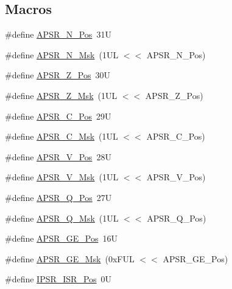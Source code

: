 \subsection*{Macros}
\begin{DoxyCompactItemize}
\item 
\#define \mbox{\hyperlink{group__CMSIS__CORE_gac469528d210043c7bd3f12f0e6824766}{A\+P\+S\+R\+\_\+\+N\+\_\+\+Pos}}~31U
\item 
\#define \mbox{\hyperlink{group__CMSIS__CORE_gadbc2cf55a026f661b53fadfcf822cef1}{A\+P\+S\+R\+\_\+\+N\+\_\+\+Msk}}~(1\+U\+L $<$$<$ A\+P\+S\+R\+\_\+\+N\+\_\+\+Pos)
\item 
\#define \mbox{\hyperlink{group__CMSIS__CORE_ga3661286d108b1aca308d7445685eae3a}{A\+P\+S\+R\+\_\+\+Z\+\_\+\+Pos}}~30U
\item 
\#define \mbox{\hyperlink{group__CMSIS__CORE_ga1deb4d1aa72bb83d1f79329406f15711}{A\+P\+S\+R\+\_\+\+Z\+\_\+\+Msk}}~(1\+U\+L $<$$<$ A\+P\+S\+R\+\_\+\+Z\+\_\+\+Pos)
\item 
\#define \mbox{\hyperlink{group__CMSIS__CORE_ga6cf72aa6f09a168f9e5beda1a4a887b9}{A\+P\+S\+R\+\_\+\+C\+\_\+\+Pos}}~29U
\item 
\#define \mbox{\hyperlink{group__CMSIS__CORE_ga6d47803fbad455bc10bd1ce59f2f335d}{A\+P\+S\+R\+\_\+\+C\+\_\+\+Msk}}~(1\+U\+L $<$$<$ A\+P\+S\+R\+\_\+\+C\+\_\+\+Pos)
\item 
\#define \mbox{\hyperlink{group__CMSIS__CORE_gac62830f67679ccd11658c4172c3e6ea7}{A\+P\+S\+R\+\_\+\+V\+\_\+\+Pos}}~28U
\item 
\#define \mbox{\hyperlink{group__CMSIS__CORE_ga33305d6701356bff6890b315fe8b5489}{A\+P\+S\+R\+\_\+\+V\+\_\+\+Msk}}~(1\+U\+L $<$$<$ A\+P\+S\+R\+\_\+\+V\+\_\+\+Pos)
\item 
\#define \mbox{\hyperlink{group__CMSIS__CORE_ga298749e176f12827328bb7b92a6b2411}{A\+P\+S\+R\+\_\+\+Q\+\_\+\+Pos}}~27U
\item 
\#define \mbox{\hyperlink{group__CMSIS__CORE_ga90ffd4ec4149c2f5dd7747c1533fb002}{A\+P\+S\+R\+\_\+\+Q\+\_\+\+Msk}}~(1\+U\+L $<$$<$ A\+P\+S\+R\+\_\+\+Q\+\_\+\+Pos)
\item 
\#define \mbox{\hyperlink{group__CMSIS__CORE_ga722cb42b5c75af3e8909fac6fd40dfdc}{A\+P\+S\+R\+\_\+\+G\+E\+\_\+\+Pos}}~16U
\item 
\#define \mbox{\hyperlink{group__CMSIS__CORE_ga8a3ecbc0ea2029462b0f4ce50e227db1}{A\+P\+S\+R\+\_\+\+G\+E\+\_\+\+Msk}}~(0x\+F\+U\+L $<$$<$ A\+P\+S\+R\+\_\+\+G\+E\+\_\+\+Pos)
\item 
\#define \mbox{\hyperlink{group__CMSIS__CORE_ga0e34027584d02c43811ae908a5ca9adf}{I\+P\+S\+R\+\_\+\+I\+S\+R\+\_\+\+Pos}}~0U

\end{DoxyCompactItemize}
